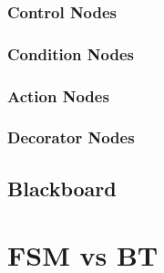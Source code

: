 \subsubsection{Control Nodes}
\label{subsubsec:control_nodes}

\subsubsection{Condition Nodes}

\subsubsection{Action Nodes}

\subsubsection{Decorator Nodes}

\subsection{Blackboard}


\cite{BlackboardDesignPattern}


\section{FSM vs BT}
